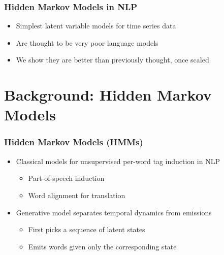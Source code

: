 \documentclass{beamer}
\begin{document}
\begin{frame}
\frametitle{Hidden Markov Models in NLP}
\begin{itemize}
\item Simplest latent variable models for time series data
\vspace{2em}
\item Are thought to be very poor language models
\vspace{2em}
\item We show they are better than previously thought, once scaled
\end{itemize}
\end{frame}

\section{Background: Hidden Markov Models}
\begin{frame}
\frametitle{Hidden Markov Models (HMMs)}
\begin{itemize}
\item Classical models for unsupervised per-word tag induction in NLP
\vspace{1em}
    \begin{itemize}
    \item Part-of-speech induction
    \vspace{1em}
    \item Word alignment for translation
    \end{itemize}
\vspace{1em}
\item Generative model separates temporal dynamics from emissions
\vspace{1em}
    \begin{itemize}
    \item First picks a sequence of latent states
    \vspace{1em}
    \item Emits words given only the corresponding state
    \end{itemize}
\end{itemize}
\end{frame}
\end{document}

